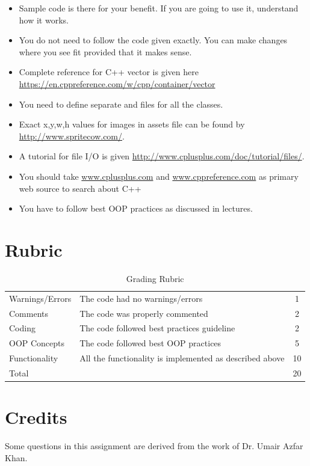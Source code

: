 \documentclass[a4paper,12pt]{article}
\begin{document}
	\begin{itemize}
		\item Sample code is there for your benefit. If you are going to use it, understand how it works. 
		\item You do not need to follow the code given exactly. You can make changes where you see fit provided that it makes sense.
		\item Complete reference for C++ vector is given here \url{https://en.cppreference.com/w/cpp/container/vector}
		\item You need to define separate  and  files for all the classes.
		\item Exact x,y,w,h values for images in assets file can be found by \url{http://www.spritecow.com/}. 
		\item A tutorial for file I/O is given \url{http://www.cplusplus.com/doc/tutorial/files/}. 
		\item You should take \url{www.cplusplus.com} and \url{www.cppreference.com} as primary web source to search about C++
		\item You have to follow best OOP practices as discussed in lectures.
	\end{itemize}

\newpage

		\section{Rubric}
	\begin{table}[!h]
		\centering
		\begin{tabular}{llc}
			\toprule
			Warnings/Errors	& The code had no warnings/errors	& 1 \\
			Comments &	The code was properly commented	& 2 \\
			Coding	& The code followed best practices guideline &	2 \\
			OOP Concepts & The code followed best OOP practices & 5 \\
			Functionality	& All the functionality is implemented as described above	& 10 \\
			\midrule
			Total & & 20\\
			\bottomrule
		\end{tabular}
		\caption{Grading Rubric}
		\label{Grading}
	\end{table}
	\section{Credits}
		Some questions in this assignment are derived from the work of Dr. Umair Azfar Khan.

	\newpage
	
	
\end{document}
